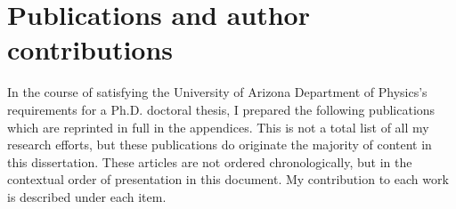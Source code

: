 \chapter*{Publications and author contributions}
\label{sec:pubs}
In the course of satisfying the University of Arizona Department of Physics's requirements for a Ph.D. doctoral thesis, I prepared the following publications which are reprinted in full in the appendices. This is not a total list of all my research efforts, but these publications do originate the majority of content in this dissertation. These articles are not ordered chronologically, but in the contextual order of presentation in this document. My contribution to each work is described under each item.
